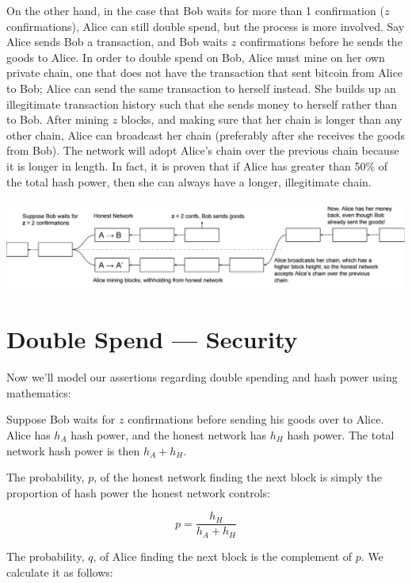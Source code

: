 \documentclass[full.tex]{subfiles}
\begin{document}
  On the other hand, in the case that Bob waits for more than 1 confirmation ($z$ confirmations), Alice can still double spend, but the process is more involved. Say Alice sends Bob a transaction, and Bob waits $z$ confirmations before he sends the goods to Alice. In order to double spend on Bob, Alice must mine on her own private chain, one that does not have the transaction that sent bitcoin from Alice to Bob; Alice can send the same transaction to herself instead. She builds up an illegitimate transaction history such that she sends money to herself rather than to Bob. After mining $z$ blocks, and making sure that her chain is longer than any other chain, Alice can broadcast her chain (preferably after she receives the goods from Bob). The network will adopt Alice's chain over the previous chain because it is longer in length. In fact, it is proven that if Alice has greater than 50\% of the total hash power, then she can always have a longer, illegitimate chain. \\ \\
 
   \includegraphics[scale=0.3]{z_confirmation} \\
   
   \section*{Double Spend --- Security}
   
   Now we'll model our assertions regarding double spending and hash power using mathematics:
   
   Suppose Bob waits for $z$ confirmations before sending his goods over to Alice. Alice has $h_A$ hash power, and the honest network has $h_H$ hash power. The total network hash power is then $h_A + h_H$. 
   
   The probability, $p$, of the honest network finding the next block is simply the proportion of hash power the honest network controls:
   
   $$p = \frac{h_H}{h_A + h_H} $$
   
   The probability, $q$, of Alice finding the next block is the complement of $p$. We calculate it as follows:
   
\end{document}
